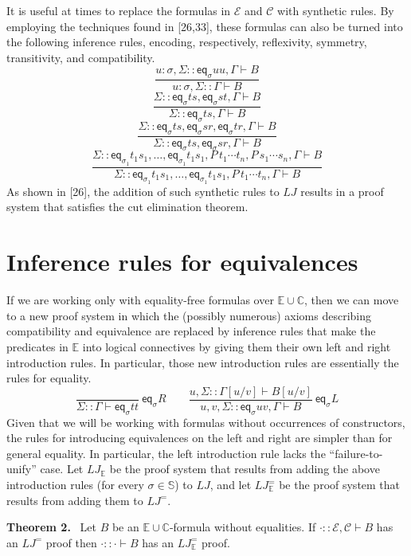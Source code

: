 \documentclass[10pt,a4paper]{article}
\newcommand{\pmLJ}{\mathit{LJ}}
\newcommand{\pmS}{\mathbb S}
\newcommand{\pmEs}{\mathbb E}\newcommand{\pmCs}{\mathbb C}
\newcommand{\pmEa}{\mathcal E}\newcommand{\pmCa}{\mathcal C}
\newcommand{\pmeq}{\mathsf{eq}}
\newcommand{\pmseq}[3]{#1\mathbin{::}#2\vdash #3}
\newcommand{\pmorig}[2]{\par\medskip\noindent\textbf{#1 #2.}\ }
\begin{document}
It is useful at times to replace the formulas in $\pmEa$ and $\pmCa$ with synthetic rules. By employing the techniques found in [26,33], these formulas can also be turned into the following inference rules, encoding, respectively, reflexivity, symmetry, transitivity, and compatibility.
\[\frac{\pmseq{u:\sigma,\Sigma}{\pmeq_\sigma u u,\Gamma}B}{\pmseq{u:\sigma,\Sigma}\Gamma B}\]
\[
\frac{\pmseq\Sigma{\pmeq_\sigma t s,\pmeq_\sigma s t,\Gamma}B}{\pmseq\Sigma{\pmeq_\sigma t s,\Gamma}B}\]
\[\frac{\pmseq\Sigma{\pmeq_\sigma t s,\pmeq_\sigma s r,\pmeq_\sigma t r,\Gamma}B}{\pmseq\Sigma{\pmeq_\sigma t s,\pmeq_\sigma s r,\Gamma}B}\]
\[\frac{\pmseq\Sigma{\pmeq_{\sigma_1}t_1s_1,\ldots,\pmeq_{\sigma_1}t_1s_1,P\,t_1\cdots t_n,P\,s_1\cdots s_n,\Gamma}B}{\pmseq\Sigma{\pmeq_{\sigma_1}t_1s_1,\ldots,\pmeq_{\sigma_1}t_1s_1,P\,t_1\cdots t_n,\Gamma}B}\]
As shown in [26], the addition of such synthetic rules to $\pmLJ$ results in a proof system that satisfies the cut elimination theorem.
\section*{Inference rules for equivalences}
If we are working only with equality-free formulas over $\pmEs\cup\pmCs$, then we can move to a new proof system in which the (possibly numerous) axioms describing compatibility and equivalence are replaced by inference rules that make the predicates in $\pmEs$ into logical connectives by giving them their own left and right introduction rules. In particular, those new introduction rules are essentially the rules for equality.
\[\frac{}{\pmseq\Sigma\Gamma{\pmeq_\sigma t t}}\ \pmeq_\sigma R\qquad
\frac{\pmseq{u,\Sigma}{\Gamma[u/v]}{B[u/v]}}{\pmseq{u,v,\Sigma}{\pmeq_\sigma u v,\Gamma}B}\ \pmeq_\sigma L\]
Given that we will be working with formulas without occurrences of constructors, the rules for introducing equivalences on the left and right are simpler than for general equality. In particular, the left introduction rule lacks the ``failure-to-unify'' case. Let $\pmLJ_{\pmEs}$ be the proof system that results from adding the above introduction rules (for every $\sigma\in\pmS$) to $\pmLJ$, and let $\pmLJ^=_{\pmEs}$ be the proof system that results from adding them to $\pmLJ^=$.

\pmorig{Theorem}{2} Let $B$ be an $\pmEs\cup\pmCs$-formula without equalities. If $\pmseq\cdot{\pmEa,\pmCa}B$ has an $\pmLJ^=$ proof then $\pmseq\cdot\cdot B$ has an $\pmLJ^=_{\pmEs}$ proof.
\end{document}
